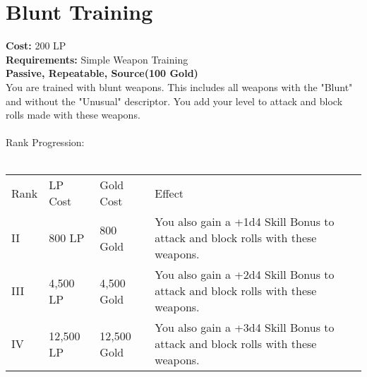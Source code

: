 \section{Blunt Training}\label{perk:bluntTraining}
\textbf{Cost:} 200 LP\\
\textbf{Requirements:} Simple Weapon Training\\
\textbf{Passive, Repeatable, Source(100 Gold)}\\
You are trained with blunt weapons.
This includes all weapons with the "Blunt" and without the "Unusual" descriptor.
You add your level to attack and block rolls made with these weapons.\\
\\
Rank Progression:\\
\\
\begin{longtable}{l | l | l | p{9cm}}
	Rank & LP Cost & Gold Cost & Effect\\
	II & 800 LP & 800 Gold & You also gain a +1d4 Skill Bonus to attack and block rolls with these weapons.\\
	III & 4,500 LP & 4,500 Gold & You also gain a +2d4 Skill Bonus to attack and block rolls with these weapons.\\
	IV & 12,500 LP & 12,500 Gold & You also gain a +3d4 Skill Bonus to attack and block rolls with these weapons.\\
\end{longtable}